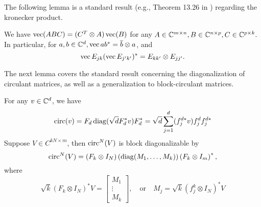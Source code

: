The following lemma is a standard result (e.g., Theorem 13.26 in \cite{laub2004matrix}) regarding the kronecker product.

\begin{lemma}
  We have $\operatorname{vec}(A B C) = (C^T \otimes A) \operatorname{vec}(B)$ for any $A \in \mathbb{C}^{m \times n}, B \in \mathbb{C}^{n \times p}, C \in \mathbb{C}^{p \times k}.$  In particular, for $a, b \in \mathbb{C}^d, \operatorname{vec} a b^* = \overline{b} \otimes a$, and \begin{equation} \operatorname{vec} E_{jk} (\operatorname{vec} E_{j' k'})^* = E_{k k'} \otimes E_{j j'}. \label{id:kronsimp}\end{equation}
  \label{lem:kronvec}
\end{lemma}
The next lemma covers the standard result concerning the diagonalization of circulant matrices, as well as a generalization to block-circulant matrices.
\begin{lemma}
  For any $v \in \mathbb{C}^d$, we have \begin{equation} \operatorname{circ}(v) = F_d \operatorname{diag}(\sqrt{d} F_d^* v) F_d^* = \sqrt{d} \sum_{j = 1}^d (f_j^{d *} v) f_j^d f_j^{d *} \label{eq:circ_dft_diag} \end{equation}
  Suppose $V \in C^{k N \times m}$, then $\operatorname{circ}^N(V)$ is block diagonalizable by \begin{equation} \operatorname{circ}^N(V) = \left(F_k \otimes I_N\right) \left(\operatorname{diag}(M_1, \ldots, M_k)\right) \left(F_k \otimes I_m\right)^*,  \label{eq:circ_dft_blk} \end{equation} where \begin{equation} \sqrt{k}\left(F_k \otimes I_N\right)^* V = \begin{bmatrix} M_1 \\ \vdots \\ M_k \end{bmatrix}, \quad \text{or} \quad M_j = \sqrt{k} (f_j^k \otimes I_N)^* V \label{eq:M_ell}\end{equation} \label{lem:circ_diag}
\end{lemma}

